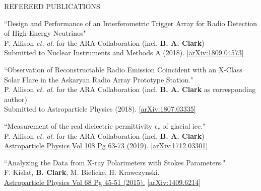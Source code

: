 \documentclass{resume} %
\begin{document}
\begin{rSection}{REFEREED PUBLICATIONS}
\begin{etaremune}%
  \item ``Design and Performance of an Interferometric Trigger Array for Radio Detection of High-Energy Neutrinos" \\
 P. Allison {\it et. al.} for the ARA Collaboration (incl. \textbf{B. A. Clark}) \\
 Submitted to Nuclear Instruments and Methods A (2018). \href{https://arxiv.org/abs/1809.04573}{[arXiv:1809.04573]}
 \item ``Observation of Reconstructable Radio Emission Coincident with an X-Class Solar Flare in the Askaryan Radio Array Prototype Station." \\
 P. Allison {\it et. al.} for the ARA Collaboration (incl. \textbf{B. A. Clark} as corresponding author) \\
 Submitted to Astroparticle Physics (2018). \href{https://arxiv.org/abs/1807.03335}{[arXiv:1807.03335]}
  \item ``Measurement of the real dielectric permittivity $\epsilon_r$ of glacial ice." \\
 P. Allison {\it et. al.} for the ARA Collaboration (incl. \textbf{B. A. Clark}) \\
  \href{https://doi.org/10.1016/j.astropartphys.2019.01.004}{Astroparticle Physics Vol 108 Pg 63-73 (2019).} \href{https://arxiv.org/abs/1712.03301}{[arXiv:1712.03301]} 
   \item ``Analyzing the Data from X-ray Polarimeters with Stokes Parameters." \\
 F. Kislat,  \textbf{B. Clark}, M. Bielicke, H. Krawczynski.  \\
  \href{http://dx.doi.org/10.1016/j.astropartphys.2015.02.007}{Astroparticle Physics Vol 68 Pg 45-51 (2015).} \href{https://arxiv.org/abs/1409.6214}{[arXiv:1409.6214]} 
 \end{etaremune}
\end{rSection}

\end{document}
